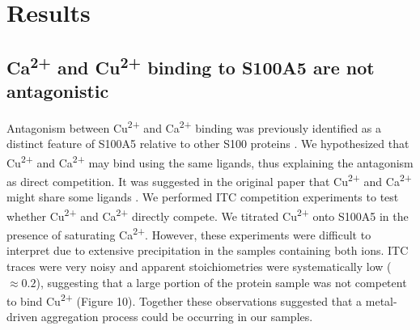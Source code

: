 \section{Results}

\subsection{Ca\protect\textsuperscript{2+} and Cu\protect\textsuperscript{2+} 
binding to S100A5 are not antagonistic}

Antagonism between Cu\textsuperscript{2+} and Ca\textsuperscript{2+} 
binding was previously identified as a distinct feature of S100A5
relative to other S100 proteins \cite{schafer_brain_2000,moroz_role_2010,gilston_binding_2016}.
We hypothesized that Cu\textsuperscript{2+} and Ca\textsuperscript{2+} 
may bind using the same ligands, thus explaining the antagonism as
direct competition. It was suggested in the original paper that Cu\textsuperscript{2+} and
Ca\textsuperscript{2+} might share some ligands \cite{schafer_brain_2000}.
We performed ITC competition experiments to test whether Cu\textsuperscript{2+} and
Ca\textsuperscript{2+} directly compete. We titrated Cu\textsuperscript{2+} onto
S100A5 in the presence of saturating Ca\textsuperscript{2+}. However,
these experiments were difficult to interpret due to extensive precipitation
in the samples containing both ions. ITC traces were very noisy and
apparent stoichiometries were systematically low ($\approx0.2$),
suggesting that a large portion of the protein sample was not competent
to bind Cu\textsuperscript{2+} (Figure 10). Together these observations
suggested that a metal-driven aggregation process could be occurring
in our samples.

